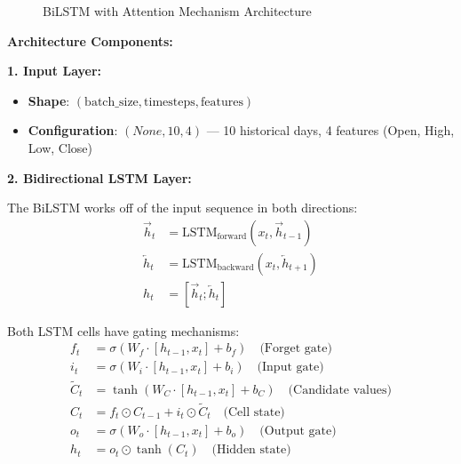 \begin{figure}[htbp]
    \caption{BiLSTM with Attention Mechanism Architecture}
    \label{fig:bilstm_attention}
\end{figure}

\textbf{Architecture Components:}

\textbf{1. Input Layer:}
\begin{itemize}
    \item \textbf{Shape}: $(\text{batch\_size}, \text{timesteps}, \text{features})$
    \item \textbf{Configuration}: $(None, 10, 4)$ --- 10 historical days, 4 features (Open, High, Low, Close)
\end{itemize}

\textbf{2. Bidirectional LSTM Layer:}

The BiLSTM works off of the input sequence in both directions:
\begin{align}
\overrightarrow{h}_t &= \text{LSTM}_{\text{forward}}(x_t, \overrightarrow{h}_{t-1}) \\
\overleftarrow{h}_t &= \text{LSTM}_{\text{backward}}(x_t, \overleftarrow{h}_{t+1}) \\
h_t &= [\overrightarrow{h}_t; \overleftarrow{h}_t]
\end{align}

Both LSTM cells have gating mechanisms:
\begin{align}
f_t &= \sigma(W_f \cdot [h_{t-1}, x_t] + b_f) \quad \text{(Forget gate)} \\
i_t &= \sigma(W_i \cdot [h_{t-1}, x_t] + b_i) \quad \text{(Input gate)} \\
\tilde{C}_t &= \tanh(W_C \cdot [h_{t-1}, x_t] + b_C) \quad \text{(Candidate values)} \\
C_t &= f_t \odot C_{t-1} + i_t \odot \tilde{C}_t \quad \text{(Cell state)} \\
o_t &= \sigma(W_o \cdot [h_{t-1}, x_t] + b_o) \quad \text{(Output gate)} \\
h_t &= o_t \odot \tanh(C_t) \quad \text{(Hidden state)}
\end{align}

